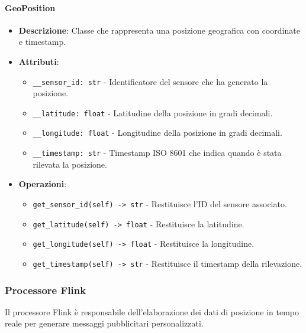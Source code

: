 \documentclass[10pt]{article}
\begin{document}
    \paragraph{GeoPosition}
    \begin{itemize}
        \item \textbf{Descrizione}: Classe che rappresenta una posizione geografica con coordinate e timestamp.
        \item \textbf{Attributi}:
        \begin{itemize}
            \item \texttt{\_\_sensor\_id: str} - Identificatore del sensore che ha generato la posizione.
            \item \texttt{\_\_latitude: float} - Latitudine della posizione in gradi decimali.
            \item \texttt{\_\_longitude: float} - Longitudine della posizione in gradi decimali.
            \item \texttt{\_\_timestamp: str} - Timestamp ISO 8601 che indica quando è stata rilevata la posizione.
        \end{itemize}
        \item \textbf{Operazioni}:
        \begin{itemize}
            \item \texttt{get\_sensor\_id(self) -> str} - Restituisce l'ID del sensore associato.
            \item \texttt{get\_latitude(self) -> float} - Restituisce la latitudine.
            \item \texttt{get\_longitude(self) -> float} - Restituisce la longitudine.
            \item \texttt{get\_timestamp(self) -> str} - Restituisce il timestamp della rilevazione.
        \end{itemize}
    \end{itemize}

    \subsubsection{Processore Flink}
    Il processore Flink è responsabile dell'elaborazione dei dati di posizione in tempo reale per generare messaggi pubblicitari personalizzati.

\end{document}

